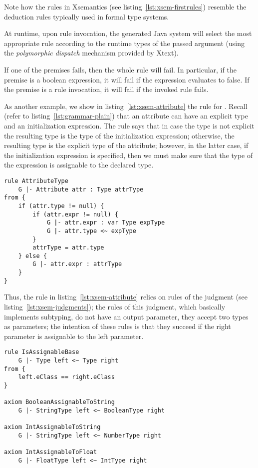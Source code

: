 \noindent
Note how the rules in Xsemantics (see listing~\ref{lst:xsem-firstrules})
resemble the deduction rules typically used in formal type systems.

At runtime, upon rule invocation, the generated Java system will select the most
appropriate rule according to the runtime types of the passed argument (using
the \textit{polymorphic dispatch} mechanism provided by Xtext).

If one of the premises fails, then the whole rule will fail.
In particular, if the premise is a boolean expression, it will fail if the
expression evaluates to false.  If the premise is a rule invocation, it will
fail if the invoked rule fails.

As another example, we show in listing~\ref{lst:xsem-attribute} the rule for
.  Recall (refer to listing~\ref{lst:grammar-plain}) that an
attribute can have an explicit type and an initialization expression. The rule
says that in case the type is not explicit the resulting type is the type of the
initialization expression; otherwise, the resulting type is the explicit type of
the attribute; however, in the latter case, if the initialization expression is
specified, then we must make sure that the type of the expression is assignable
to the declared type.

\begin{lstlisting}[language=xsemantics,float,label=lst:xsem-attribute,caption=Type
rule for \mytt{Attribute}.] 
rule AttributeType 
	G |- Attribute attr : Type attrType 
from {
	if (attr.type != null) {
		if (attr.expr != null) {
			G |- attr.expr : var Type expType
			G |- attr.type <~ expType
		}
		attrType = attr.type
	} else {
		G |- attr.expr : attrType
	}
}
\end{lstlisting}

Thus, the rule in listing~\ref{lst:xsem-attribute} relies on rules of the
judgment  (see listing~\ref{lst:xsem-judgments}); the rules
of this judgment, which basically implements subtyping, do not have an output
parameter, they accept two types as parameters; the intention of these rules is
that they succeed if the right parameter is assignable to the left parameter.

\begin{lstlisting}[language=xsemantics,float,label=lst:xsem-assignable,caption=Some
rules for the \mytt{isAssignable} judgment.] 
rule IsAssignableBase
	G |- Type left <~ Type right
from {
	left.eClass == right.eClass
}

axiom BooleanAssignableToString
	G |- StringType left <~ BooleanType right

axiom IntAssignableToString
	G |- StringType left <~ NumberType right

axiom IntAssignableToFloat
	G |- FloatType left <~ IntType right
\end{lstlisting}

